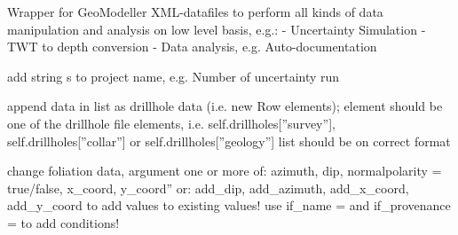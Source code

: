 \documentclass[letterpaper,10pt,english]{sphinxmanual}
\begin{document}
\begin{fulllineitems}
\label{pygeomod:pygeomod.geomodeller_xml_obj.GeomodellerClass}
Wrapper for GeoModeller XML-datafiles to perform all kinds of data
manipulation and analysis on low level basis, e.g.:
- Uncertainty Simulation
- TWT to depth conversion
- Data analysis, e.g. Auto-documentation

\begin{fulllineitems}
\label{pygeomod:pygeomod.geomodeller_xml_obj.GeomodellerClass.add_to_project_name}
add string s to project name, e.g. Number of uncertainty run

\end{fulllineitems}


\begin{fulllineitems}
\label{pygeomod:pygeomod.geomodeller_xml_obj.GeomodellerClass.append_drillhole_data}
append data in list as drillhole data (i.e. new Row elements); 
element should
be one of the drillhole file elements, i.e. 
self.drillholes{[}''survey''{]}, self.drillholes{[}''collar''{]} 
or self.drillholes{[}''geology''{]} 
list should be on correct format

\end{fulllineitems}


\begin{fulllineitems}
\label{pygeomod:pygeomod.geomodeller_xml_obj.GeomodellerClass.change_foliation}
change foliation data, argument one or more of: azimuth, dip, 
normalpolarity = true/false, x\_coord, y\_coord'' or: add\_dip, add\_azimuth,
add\_x\_coord, add\_y\_coord to add values to existing values!
use if\_name = and if\_provenance = to add conditions!

\end{fulllineitems}



\end{fulllineitems}
\end{document}
